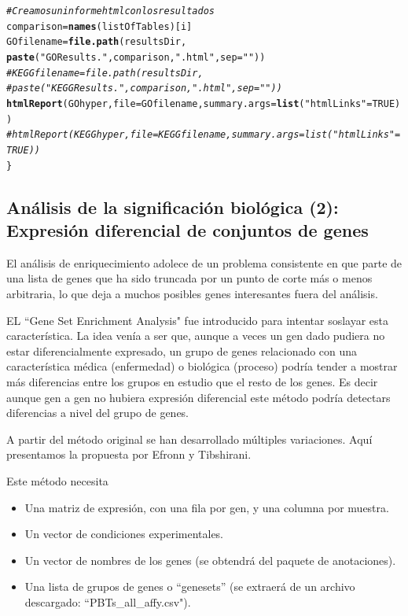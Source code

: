 \documentclass[a4paper]{article}\usepackage[]{graphicx}\usepackage[]{color}
\makeatletter
\newcommand{\hlnum}[1]{\textcolor[rgb]{0.686,0.059,0.569}{#1}}%
\newcommand{\hlstr}[1]{\textcolor[rgb]{0.192,0.494,0.8}{#1}}%
\newcommand{\hlcom}[1]{\textcolor[rgb]{0.678,0.584,0.686}{\textit{#1}}}%
\newcommand{\hlstd}[1]{\textcolor[rgb]{0.345,0.345,0.345}{#1}}%
\newcommand{\hlkwb}[1]{\textcolor[rgb]{0.69,0.353,0.396}{#1}}%
\newcommand{\hlkwc}[1]{\textcolor[rgb]{0.333,0.667,0.333}{#1}}%
\newcommand{\hlkwd}[1]{\textcolor[rgb]{0.737,0.353,0.396}{\textbf{#1}}}%
\newenvironment{kframe}{%
 \def\at@end@of@kframe{}%
 \ifinner\ifhmode%
  \def\at@end@of@kframe{\end{minipage}}%
  \begin{minipage}{\columnwidth}%
 \fi\fi%
 \def\FrameCommand##1{\hskip\@totalleftmargin \hskip-\fboxsep
 \colorbox{shadecolor}{##1}\hskip-\fboxsep
     \hskip-\linewidth \hskip-\@totalleftmargin \hskip\columnwidth}%
 \MakeFramed {\advance\hsize-\width
   \@totalleftmargin\z@ \linewidth\hsize
   \@setminipage}}%
 {\par\unskip\endMakeFramed%
 \at@end@of@kframe}
\newenvironment{knitrout}{}{} %
\makeatother
\begin{document}
\begin{knitrout}
\begin{kframe}
\begin{alltt}
\hlcom{# Creamos un informe html con los resultados}
   \hlstd{comparison} \hlkwb{=} \hlkwd{names}\hlstd{(listOfTables)[i]}
   \hlstd{GOfilename} \hlkwb{=}\hlkwd{file.path}\hlstd{(resultsDir,}
     \hlkwd{paste}\hlstd{(}\hlstr{"GOResults."}\hlstd{,comparison,}\hlstr{".html"}\hlstd{,} \hlkwc{sep}\hlstd{=}\hlstr{""}\hlstd{))}
   \hlcom{# KEGGfilename =file.path(resultsDir, }
   \hlcom{#   paste("KEGGResults.",comparison,".html", sep=""))}
  \hlkwd{htmlReport}\hlstd{(GOhyper,} \hlkwc{file} \hlstd{= GOfilename,} \hlkwc{summary.args}\hlstd{=}\hlkwd{list}\hlstd{(}\hlstr{"htmlLinks"}\hlstd{=}\hlnum{TRUE}\hlstd{))}
  \hlcom{# htmlReport(KEGGhyper, file = KEGGfilename, summary.args=list("htmlLinks"=TRUE))}
\hlstd{\}}
\end{alltt}
\end{kframe}
\end{knitrout}

\subsection{Análisis de la significación biológica (2): Expresión diferencial de conjuntos de genes}

El análisis de enriquecimiento adolece de un problema consistente en que parte de una lista de genes que ha sido truncada por un punto de corte más o menos arbitraria, lo que deja a muchos posibles genes interesantes fuera del análisis.

EL ``Gene Set Enrichment Analysis" fue introducido para intentar soslayar esta característica. La idea venía a ser que, aunque a veces un gen dado pudiera no estar diferencialmente expresado, un grupo de genes relacionado con una característica médica (enfermedad) o biológica (proceso) podría tender a mostrar más diferencias entre los grupos en estudio que el resto de los genes. Es decir aunque gen a gen no hubiera expresión diferencial este método podría detectars diferencias a nivel del grupo de genes.

A partir del método original se han desarrollado múltiples variaciones. 
Aquí presentamos la propuesta por Efronn y Tibshirani.

Este método necesita
\begin{itemize}
  \item Una matriz de expresión, con una fila por gen, y una columna por muestra.
  \item Un vector de condiciones experimentales.
  \item Un vector de nombres de los genes (se obtendrá del paquete de anotaciones).
  \item Una lista de grupos de genes o ``genesets'' (se extraerá de un archivo descargado: ``PBTs_all_affy.csv").
\end{itemize}
\end{document}
